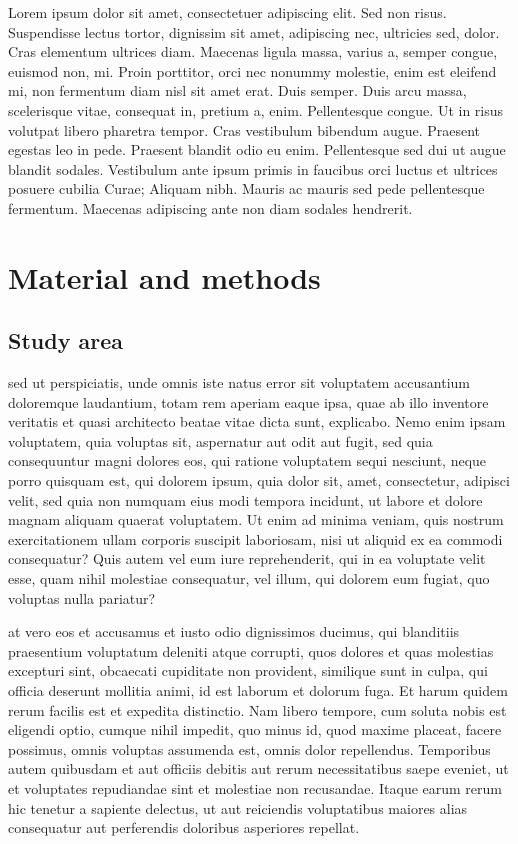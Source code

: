 \documentclass[a4paper,11pt,twoside]{article}
\begin{document}
%
%
\noindent Lorem ipsum dolor sit amet, consectetuer adipiscing elit. Sed non
risus. Suspendisse lectus tortor, dignissim sit amet, adipiscing nec, ultricies
sed, dolor. Cras elementum ultrices diam. Maecenas ligula massa, varius a,
semper congue, euismod non, mi. Proin porttitor, orci nec nonummy molestie, enim
est eleifend mi, non fermentum diam nisl sit amet erat. Duis semper. Duis arcu
massa, scelerisque vitae, consequat in, pretium a, enim. Pellentesque congue. Ut
in risus volutpat libero pharetra tempor. Cras vestibulum bibendum
augue. Praesent egestas leo in pede. Praesent blandit odio eu enim. Pellentesque
sed dui ut augue blandit sodales. Vestibulum ante ipsum primis in faucibus orci
luctus et ultrices posuere cubilia Curae; Aliquam nibh. Mauris ac mauris sed
pede pellentesque fermentum. Maecenas adipiscing ante non diam sodales
hendrerit.

\section*{Material and methods} %

\subsection*{Study area}

\citet{Fournier_1982} sed ut perspiciatis, unde omnis iste natus error sit voluptatem
accusantium doloremque laudantium, totam rem aperiam eaque ipsa, quae ab illo inventore
veritatis et quasi architecto beatae vitae dicta sunt, explicabo. Nemo enim ipsam
voluptatem, quia voluptas sit, aspernatur aut odit aut fugit, sed quia consequuntur magni
dolores eos, qui ratione voluptatem sequi nesciunt, neque porro quisquam est, qui dolorem
ipsum, quia dolor sit, amet, consectetur, adipisci velit, sed quia non numquam eius modi
tempora incidunt, ut labore et dolore magnam aliquam quaerat voluptatem. Ut enim ad minima
veniam, quis nostrum exercitationem ullam corporis suscipit laboriosam, nisi ut aliquid ex
ea commodi consequatur? Quis autem vel eum iure reprehenderit, qui in ea voluptate velit
esse, quam nihil molestiae consequatur, vel illum, qui dolorem eum fugiat, quo voluptas
nulla pariatur? 

\citet{Hirzel_2003_PROC,Holand_1998,Looijen_1998_PhD} at vero eos et accusamus et iusto
odio dignissimos ducimus, qui blanditiis praesentium voluptatum deleniti atque corrupti,
quos dolores et quas molestias excepturi sint, obcaecati cupiditate non provident,
similique sunt in culpa, qui officia deserunt mollitia animi, id est laborum et dolorum
fuga. Et harum quidem rerum facilis est et expedita distinctio. Nam libero tempore, cum
soluta nobis est eligendi optio, cumque nihil impedit, quo minus id, quod maxime placeat,
facere possimus, omnis voluptas assumenda est, omnis dolor repellendus. Temporibus autem
quibusdam et aut officiis debitis aut rerum necessitatibus saepe eveniet, ut et voluptates
repudiandae sint et molestiae non recusandae. Itaque earum rerum hic tenetur a sapiente
delectus, ut aut reiciendis voluptatibus maiores alias consequatur aut perferendis
doloribus asperiores repellat.
\end{document}

